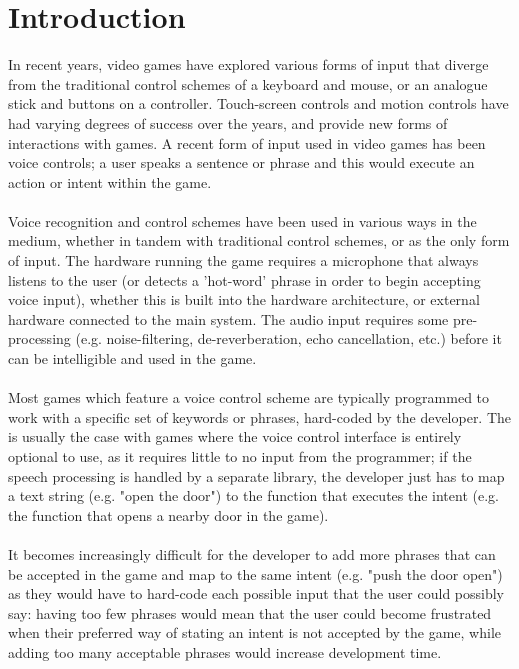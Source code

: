 \documentclass[12pt]{article}
\begin{document}
\section{Introduction}
In recent years, video games have explored various forms of input that diverge from the traditional control schemes of a keyboard and mouse, or an analogue stick and buttons on a controller. Touch-screen controls and motion controls have had varying degrees of success over the years, and provide new forms of interactions with games. A recent form of input used in video games has been voice controls; a user speaks a sentence or phrase and this would execute an action or intent within the game.
\\
\\
Voice recognition and control schemes have been used in various ways in the medium, whether in tandem with traditional control schemes, or as the only form of input. The hardware running the game requires a microphone that always listens to the user (or detects a 'hot-word' phrase in order to begin accepting voice input), whether this is built into the hardware architecture, or external hardware connected to the main system. The audio input requires some pre-processing (e.g. noise-filtering, de-reverberation, echo cancellation, etc.) before it can be intelligible and used in the game.
\\
\\
Most games which feature a voice control scheme are typically programmed to work with a specific set of keywords or phrases, hard-coded by the developer. The is usually the case with games where the voice control interface is entirely optional to use, as it requires little to no input from the programmer; if the speech processing is handled by a separate library, the developer just has to map a text string (e.g. "open the door") to the function that executes the intent (e.g. the function that opens a nearby door in the game).
\\
\\
It becomes increasingly difficult for the developer to add more phrases that can be accepted in the game and map to the same intent (e.g. "push the door open") as they would have to hard-code each possible input that the user could possibly say: having too few phrases would mean that the user could become frustrated when their preferred way of stating an intent is not accepted by the game, while adding too many acceptable phrases would increase development time.
\\
\\
\end{document}
